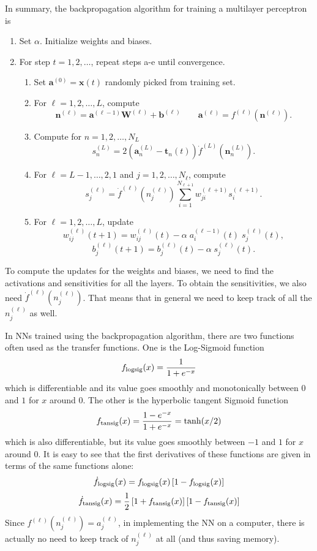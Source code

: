 \documentclass[fleqn]{article}
\begin{document}
In summary, the backpropagation algorithm for training a multilayer perceptron is
\vskip 0pt
\hypertarget{Backpropagation}{}
{\colorbox{brownbg}
{
\begin{minipage}{22pc}
\begin{enumerate}
\item
Set $\alpha$. Initialize weights and biases.
\item
For step $t=1, 2, \ldots$, repeat steps a-e until convergence.
\begin{enumerate}[a]
\item
Set $\mathbf a^{(0)} = \mathbf x(t)$ randomly picked from training set.
\item
For $\ell = 1, 2, \ldots, L$, compute
\[
\mathbf n^{(\ell)} = \mathbf a^{(\ell-1)} \mathbf W^{(\ell)} + \mathbf b^{(\ell)} \qquad
\mathbf a^{(\ell)}  = f^{(\ell)} (\mathbf n^{(\ell)} ).
\]
\item
Compute for $n=1, 2, \ldots, N_L$
\[
s_{n}^{(L)} = 2 \left(\mathbf a_n^{(L)} - \mathbf t_n(t) \right) \dot f^{(L)}(\mathbf n_n^{(L)}).
\]
\item
For $\ell = L-1, \ldots, 2, 1$ and $j=1, 2, \ldots, N_\ell$, compute
\[
s_{j}^{(\ell)}
= \dot f^{(\ell)}(n_j^{(\ell)}) \sum_{i=1}^{N_{\ell+1}} w_{ji}^{(\ell+1)} s_{i}^{(\ell+1)}.
\]
\item
For $\ell = 1, 2, \ldots, L$, update
\[
w_{ij}^{(\ell)}(t+1) = w_{ij}^{(\ell)}(t) - \alpha \; a_i^{(\ell-1)}(t) \; s_j^{(\ell)}(t),
\]
\[
b_{j}^{(\ell)}(t+1) = b_{j}^{(\ell)}(t) - \alpha \; s_j^{(\ell)}(t).
\]
\end{enumerate}
\end{enumerate}
\end{minipage}
}
}
\vskip 0pt

To compute the updates for the weights and biases,
we need to find the activations and sensitivities for all the layers.
To obtain the sensitivities, we also need $\dot f^{(\ell)}(n_j^{(\ell)})$.
That means that in general we need to keep track of all the $n_j^{(\ell)}$
as well.

In NNs trained using the backpropagation algorithm,
there are two functions often used as the transfer functions.
One is the Log-Sigmoid function
\[
f_{\mbox{\scriptsize{logsig}}}(x) = \frac{1}{1+e^{-x}}
\]
which is differentiable and its value goes smoothly and monotonically between $0$ and $1$ for $x$ around $0$.
The other is the hyperbolic tangent Sigmoid function
\[
f_{\mbox{\scriptsize{tansig}}}(x) = \frac{1-e^{-x}}{1+e^{-x}} = \tanh(x/2)
\]
which is also differentiable, but its value goes smoothly between $-1$ and $1$ for $x$ around $0$.\cite{shift}
It is easy to see that the first derivatives of these functions
are given in terms of the same functions alone:
\[
\dot f_{\mbox{\scriptsize{logsig}}}(x) =
f_{\mbox{\scriptsize{logsig}}}(x)\left[ 1-f_{\mbox{\scriptsize{logsig}}}(x)\right]
\]
\[
\dot f_{\mbox{\scriptsize{tansig}}}(x) = \frac{1}{2}
\left[1+f_{\mbox{\scriptsize{tansig}}}(x)\right] \left[ 1-f_{\mbox{\scriptsize{tansig}}}(x)\right]
\]
Since
$f^{(\ell)}(n_j^{(\ell)}) = a_j^{(\ell)}$, in implementing the NN on a computer,
there is actually no need to keep track of $n_j^{(\ell)}$ at all (and thus saving memory).
\end{document}
